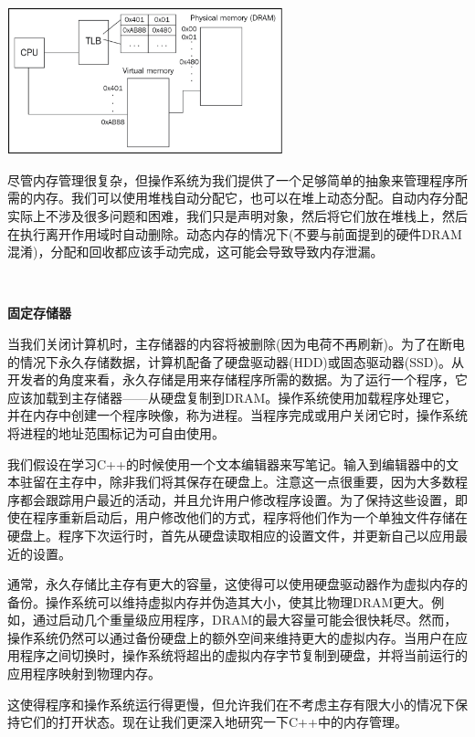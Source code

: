 \begin{center}
	\includegraphics[width=0.6\textwidth]{content/Section-1/Chapter-5/10}
\end{center}

尽管内存管理很复杂，但操作系统为我们提供了一个足够简单的抽象来管理程序所需的内存。我们可以使用堆栈自动分配它，也可以在堆上动态分配。自动内存分配实际上不涉及很多问题和困难，我们只是声明对象，然后将它们放在堆栈上，然后在执行离开作用域时自动删除。动态内存的情况下(不要与前面提到的硬件DRAM混淆)，分配和回收都应该手动完成，这可能会导致导致内存泄漏。 \par

\noindent\textbf{}\ \par
\textbf{固定存储器} \ \par
当我们关闭计算机时，主存储器的内容将被删除(因为电荷不再刷新)。为了在断电的情况下永久存储数据，计算机配备了硬盘驱动器(HDD)或固态驱动器(SSD)。从开发者的角度来看，永久存储是用来存储程序所需的数据。为了运行一个程序，它应该加载到主存储器——从硬盘复制到DRAM。操作系统使用加载程序处理它，并在内存中创建一个程序映像，称为进程。当程序完成或用户关闭它时，操作系统将进程的地址范围标记为可自由使用。 \par
我们假设在学习C++的时候使用一个文本编辑器来写笔记。输入到编辑器中的文本驻留在主存中，除非我们将其保存在硬盘上。注意这一点很重要，因为大多数程序都会跟踪用户最近的活动，并且允许用户修改程序设置。为了保持这些设置，即使在程序重新启动后，用户修改他们的方式，程序将他们作为一个单独文件存储在硬盘上。程序下次运行时，首先从硬盘读取相应的设置文件，并更新自己以应用最近的设置。 \par
通常，永久存储比主存有更大的容量，这使得可以使用硬盘驱动器作为虚拟内存的备份。操作系统可以维持虚拟内存并伪造其大小，使其比物理DRAM更大。例如，通过启动几个重量级应用程序，DRAM的最大容量可能会很快耗尽。然而，操作系统仍然可以通过备份硬盘上的额外空间来维持更大的虚拟内存。当用户在应用程序之间切换时，操作系统将超出的虚拟内存字节复制到硬盘，并将当前运行的应用程序映射到物理内存。 \par
这使得程序和操作系统运行得更慢，但允许我们在不考虑主存有限大小的情况下保持它们的打开状态。现在让我们更深入地研究一下C++中的内存管理。 \par

